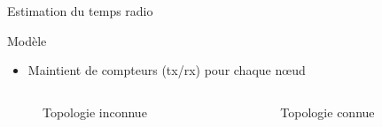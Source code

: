 \begin{frame}{Estimation du temps radio}

    \begin{block}{Modèle}
      \begin{itemize}
        \item Maintient de compteurs (tx/rx) pour chaque nœud
      \end{itemize}
    \end{block}
    
    \begin{columns}
        \begin{column}{0.50\textwidth}

          \begin{figure}
            \centering
            
            \captionsetup{labelformat=empty}
            \caption{Topologie inconnue}
          \end{figure}

        \end{column}
        \begin{column}{0.50\textwidth}

          \begin{figure}
            \centering
            
            \captionsetup{labelformat=empty}
            \caption{Topologie connue}
          \end{figure}
        \end{column}
    \end{columns}



\end{frame}

%     


